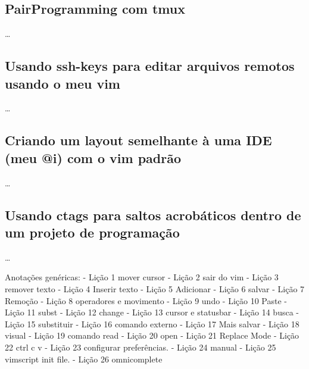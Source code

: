 \documentclass[a4paper, 12pt]{article}
\begin{document}
\subsection{PairProgramming com tmux}
\ldots
\subsection{Usando ssh-keys para editar arquivos remotos usando o meu vim}
\ldots
\subsection{Criando um layout semelhante à uma IDE (meu @i) com o vim padrão}
\ldots
\subsection{Usando ctags para saltos acrobáticos dentro de um projeto de programação}
\ldots


Anotações genéricas:
- Lição 1 mover cursor
- Lição 2 sair do vim
- Lição 3 remover texto
- Lição 4 Inserir texto
- Lição 5 Adicionar
- Lição 6 salvar
- Lição 7 Remoção
- Lição 8 operadores e movimento
- Lição 9 undo
- Lição 10 Paste
- Lição 11 subst
- Lição 12 change
- Lição 13 cursor e statusbar
- Lição 14 busca
- Lição 15 substituir
- Lição 16 comando externo
- Lição 17 Mais salvar
- Lição 18 visual
- Lição 19 comando read
- Lição 20 open
- Lição 21 Replace Mode
- Lição 22 ctrl c v
- Lição 23 configurar preferências.
- Lição 24 manual
- Lição 25 vimscript init file.
- Lição 26 omnicomplete
\end{document}
